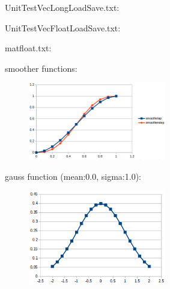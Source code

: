 UnitTestVecLongLoadSave.txt:\\
\begin{scriptsize}
\begin{ttfamily}

\end{ttfamily}
\end{scriptsize}

UnitTestVecFloatLoadSave.txt:\\
\begin{scriptsize}
\begin{ttfamily}

\end{ttfamily}
\end{scriptsize}

matfloat.txt:\\
\begin{scriptsize}
\begin{ttfamily}

\end{ttfamily}
\end{scriptsize}

smoother functions:\\
\begin{center}
\begin{figure}[H]
\centering\includegraphics[width=6cm]{./smoother.png}\\
\end{figure}
\end{center}

gauss function (mean:0.0, sigma:1.0):\\
\begin{center}
\begin{figure}[H]
\centering\includegraphics[width=6cm]{./gauss.png}\\
\end{figure}
\end{center}

